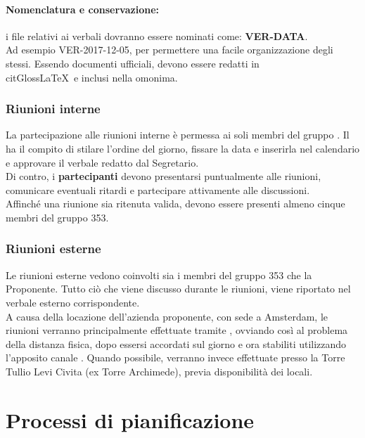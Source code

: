 \documentclass[NormeDiProgetto.tex]{subfiles}
\begin{document}
	\paragraph{Nomenclatura e conservazione:} i file relativi ai verbali dovranno essere nominati come: \textbf{VER-DATA}.\\
	Ad esempio VER-2017-12-05, per permettere una facile organizzazione degli stessi.
	Essendo documenti ufficiali, devono essere redatti in \\citGloss{LaTeX}\ e inclusi nella  omonima.
	
	\subsubsection{Riunioni interne}
	La partecipazione alle riunioni interne è permessa ai soli membri del gruppo \gruppo.
	Il \respdiprog{} ha il compito di stilare l'ordine del giorno, fissare la data e inserirla nel calendario e approvare il verbale redatto dal Segretario.\\
	Di contro, i \textbf{partecipanti} devono presentarsi puntualmente alle riunioni, comunicare eventuali ritardi e partecipare attivamente alle discussioni.\\
	Affinché una riunione sia ritenuta valida, devono essere presenti almeno cinque membri del gruppo 353.
	
	\subsubsection{Riunioni esterne}
	Le riunioni esterne vedono coinvolti sia i membri del gruppo 353 che la Proponente.
	Tutto ciò che viene discusso durante le riunioni, viene riportato nel verbale esterno corrispondente.\\
	A causa della locazione dell'azienda proponente, con sede a Amsterdam, le riunioni verranno principalmente effettuate tramite , ovviando così al problema della distanza fisica, dopo essersi accordati sul giorno e ora stabiliti utilizzando l'apposito canale .
	Quando possibile, verranno invece effettuate presso la Torre Tullio Levi Civita (ex Torre Archimede), previa disponibilità dei locali.
	
	\section{Processi di pianificazione}
\end{document}
